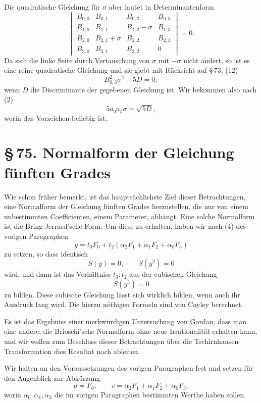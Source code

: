 \documentclass[11pt]{article}
\providecommand{\sect}[2]{\section*{\S\,#1. #2}}
\begin{document}
Die quadratische Gleichung für $\sigma$ aber lautet in Determinantenform
\[
\begin{vmatrix}
 B_{0,0}&B_{0,1}&B_{0,2}&B_{0,3}\\
 B_{1,0}&B_{1,1}&B_{1,2}-\sigma&B_{1,3}\\
 B_{2,0}&B_{2,1}+\sigma&B_{2,2}&B_{2,3}\\
 B_{3,0}&B_{3,1}&B_{3,2}&0
\end{vmatrix}=0.
\]
Da sich die linke Seite durch Vertauschung von $\sigma$ mit $-\sigma$ nicht ändert, so ist es eine reine quadratische Gleichung und sie giebt mit Rücksicht auf \S\,73, (12)
\[
 B_{0,3}^2\sigma^2-5D=0,
\]
wenn $D$ die Discriminante der gegebenen Gleichung ist. Wir bekommen also nach (2)
\begin{equation}
 5a_0a_5\sigma=\sqrt{5D},
\tag{12}
\end{equation}
worin das Vorzeichen beliebig ist.

\sect{75}{Normalform der Gleichung fünften Grades}

Wie schon früher bemerkt, ist das hauptsächlichste Ziel dieser Betrachtungen, eine Normalform der Gleichung fünften Grades herzustellen, die nur von einem unbestimmten Coefficienten, einem Parameter, abhängt. Eine solche Normalform ist die Bring-Jerrard'sche Form. Um diese zu erhalten, haben wir nach (4) des vorigen Paragraphen
\begin{equation}
 y=t_3F_0+t_2(\alpha_2F_1+\alpha_1F_2+\alpha_0F_3)
\tag{1}
\end{equation}
zu setzen, so dass identisch
\[
 S(y)=0,\qquad S(y^2)=0
\]
wird, und dann ist das Verhältniss $t_3:t_2$ aus der cubischen Gleichung
\[
 S(y^3)=0
\]
zu bilden. Diese cubische Gleichung lässt sich wirklich bilden, wenn auch ihr Ausdruck lang wird. Die hierzu nöthigen Formeln sind von Cayley berechnet.

Es ist das Ergebniss einer merkwürdigen Untersuchung von Gordan, dass man eine andere, die Brioschi'sche Normalform ohne neue Irrationalität erhalten kann, und wir wollen zum Beschluss dieser Betrachtungen über die Tschirnhausen-Transformation dies Resultat noch ableiten.

Wir halten an den Voraussetzungen des vorigen Paragraphen fest und setzen für den Augenblick zur Abkürzung
\begin{equation}
 u=F_0,\qquad v=\alpha_2F_1+\alpha_1F_2+\alpha_0F_3,
\tag{2}
\end{equation}
worin $\alpha_0,\alpha_1,\alpha_2$ die im vorigen Paragraphen bestimmten Werthe haben sollen.
\end{document}
